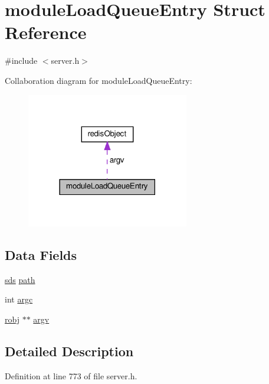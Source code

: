 \hypertarget{structmodule_load_queue_entry}{}\section{module\+Load\+Queue\+Entry Struct Reference}
\label{structmodule_load_queue_entry}


{\ttfamily \#include $<$server.\+h$>$}



Collaboration diagram for module\+Load\+Queue\+Entry\+:
\nopagebreak
\begin{figure}[H]
\begin{center}
\leavevmode
\includegraphics[width=201pt]{structmodule_load_queue_entry__coll__graph}
\end{center}
\end{figure}
\subsection*{Data Fields}
\begin{DoxyCompactItemize}
\item 
\hyperlink{sds_8h_ad69abac3df4532879db9642c95f5ef6f}{sds} \hyperlink{structmodule_load_queue_entry_aafb87a9eb5c5cc5c4d0e278bea7fdbe3}{path}
\item 
int \hyperlink{structmodule_load_queue_entry_ad1447518f4372828b8435ae82e48499e}{argc}
\item 
\hyperlink{server_8h_a540f174d2685422fbd7d12e3cd44c8e2}{robj} $\ast$$\ast$ \hyperlink{structmodule_load_queue_entry_a5c75dd3cb8eb8a3f5be7d4fdf48a9ef9}{argv}
\end{DoxyCompactItemize}


\subsection{Detailed Description}


Definition at line 773 of file server.\+h.



